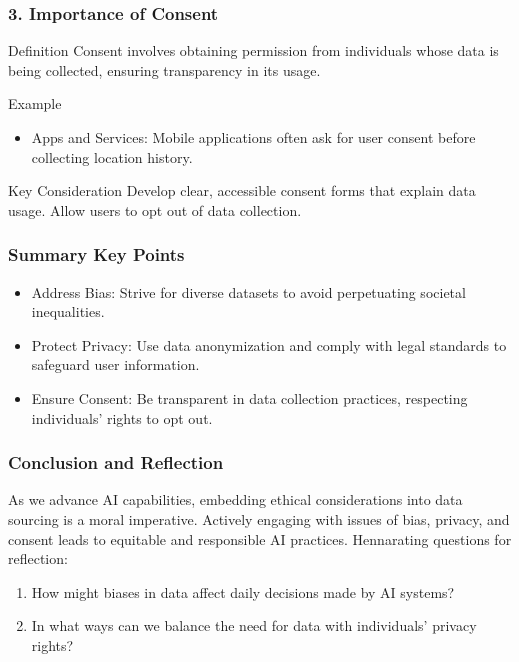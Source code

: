 \documentclass[aspectratio=169]{beamer}
\begin{document}
\begin{frame}[fragile]
    \frametitle{3. Importance of Consent}
    \begin{block}{Definition}
        Consent involves obtaining permission from individuals whose data is being collected, ensuring transparency in its usage.
    \end{block}
    
    \begin{block}{Example}
        \begin{itemize}
            \item Apps and Services: Mobile applications often ask for user consent before collecting location history.
        \end{itemize}
    \end{block}
    
    \begin{block}{Key Consideration}
        Develop clear, accessible consent forms that explain data usage. Allow users to opt out of data collection.
    \end{block}
\end{frame}

\begin{frame}[fragile]
    \frametitle{Summary Key Points}
    \begin{itemize}
        \item Address Bias: Strive for diverse datasets to avoid perpetuating societal inequalities.
        \item Protect Privacy: Use data anonymization and comply with legal standards to safeguard user information.
        \item Ensure Consent: Be transparent in data collection practices, respecting individuals' rights to opt out.
    \end{itemize}
\end{frame}

\begin{frame}[fragile]
    \frametitle{Conclusion and Reflection}
    As we advance AI capabilities, embedding ethical considerations into data sourcing is a moral imperative. Actively engaging with issues of bias, privacy, and consent leads to equitable and responsible AI practices. Hennarating questions for reflection:
    \begin{enumerate}
        \item How might biases in data affect daily decisions made by AI systems?
        \item In what ways can we balance the need for data with individuals’ privacy rights?
    \end{enumerate}
\end{frame}
\end{document}
